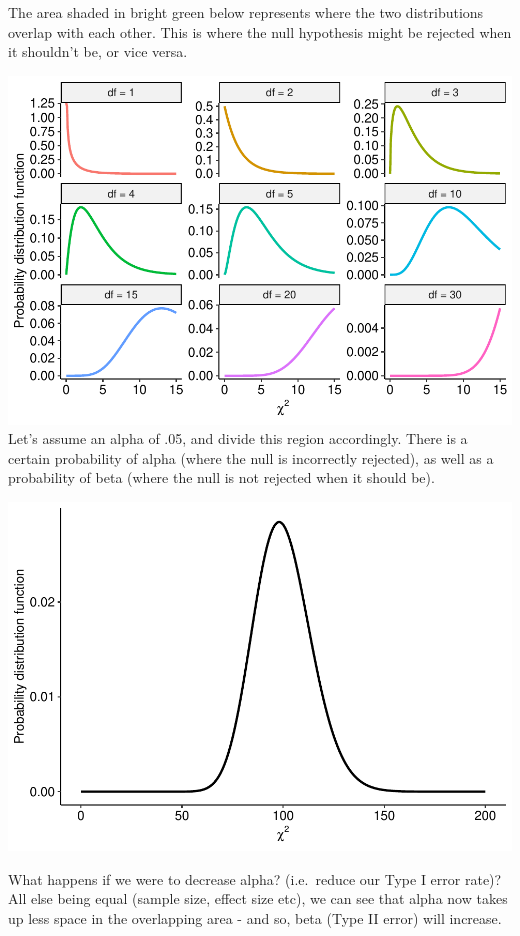 \documentclass[
]{book}
\begin{document}
The area shaded in bright green below represents where the two distributions overlap with each other. This is where the null hypothesis might be rejected when it shouldn't be, or vice versa.

\includegraphics{_main_files/figure-latex/unnamed-chunk-96-1.pdf}
Let's assume an alpha of .05, and divide this region accordingly. There is a certain probability of alpha (where the null is incorrectly rejected), as well as a probability of beta (where the null is not rejected when it should be).

\includegraphics{_main_files/figure-latex/unnamed-chunk-97-1.pdf}

What happens if we were to decrease alpha? (i.e.~reduce our Type I error rate)? All else being equal (sample size, effect size etc), we can see that alpha now takes up less space in the overlapping area - and so, beta (Type II error) will increase.
\end{document}
